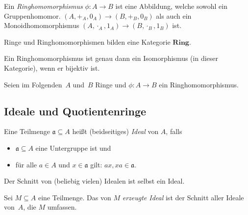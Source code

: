 \documentclass{cheat-sheet}
\newcommand{\Ring}{\mathbf{Ring}} %
\newcommand{\aaa}{\mathfrak{a}}
\begin{document}

\begin{defn}
  Ein \emph{Ringhomomorphismus} $\phi : A \to B$ ist eine Abbildung, welche sowohl ein Gruppenhomomor. $(A, +_A, 0_A) \to (B, +_B, 0_B)$ als auch ein Monoidhomomorphismus $(A, \cdot_A, 1_A) \to (B, \cdot_B, 1_B)$ ist.
\end{defn}

\begin{bem}
  Ringe und Ringhomomorphismen bilden eine Kategorie $\Ring$.
\end{bem}

\begin{lem}
  Ein Ringhomomorphismus ist genau dann ein Isomorphismus (in dieser Kategorie), wenn er bijektiv ist.
\end{lem}

\begin{samepage}

\begin{konv}
  Seien im Folgenden~$A$ und~$B$ Ringe und $\phi : A \to B$ ein Ringhomomorphismus.
\end{konv}

\subsection{Ideale und Quotientenringe}

\end{samepage}


\begin{defn}
  Eine Teilmenge $\aaa \subseteq A$ heißt (beidseitiges) \emph{Ideal} von $A$, falls
  \begin{itemize}
    \item $\aaa \subseteq A$ eine Untergruppe ist und
    \item für alle $a \in A$ und $x \in \aaa$ gilt: $ax, xa \in \aaa$.
  \end{itemize}
\end{defn}

\begin{lem}
  Der Schnitt von (beliebig vielen) Idealen ist selbst ein Ideal.
\end{lem}

\begin{defn}
  Sei $M \subseteq A$ eine Teilmenge.
  Das von $M$ \emph{erzeugte Ideal} ist der Schnitt aller Ideale von~$A$, die $M$ umfassen.
\end{defn}
\end{document}
